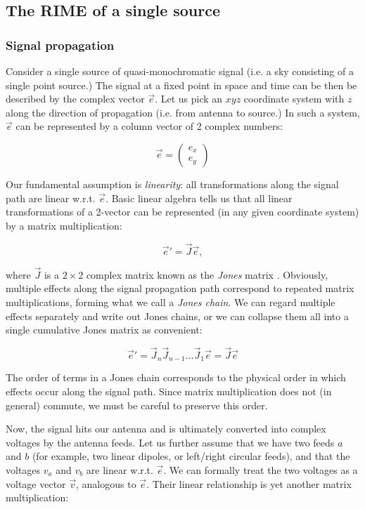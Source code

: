\documentclass[]{aa}
\begin{document}
\subsection{The RIME of a single source}

\subsubsection{Signal propagation}

Consider a single source of quasi-monochromatic signal (i.e. a sky consisting of a single point source.) The signal at a fixed point in space and time can be then be described by the complex vector $\vec e$. Let us pick an $xyz$ coordinate system with $z$ along the direction of propagation (i.e. from antenna to source.) In such a system, $\vec e$ can be represented by a column vector of 2 complex numbers:

\[
\vec e = \left( \begin{array}{c}e_x\\e_y\end{array} \right) 
\]

Our fundamental assumption is {\em linearity}: all transformations along the signal path are linear w.r.t. $\vec e$. Basic linear algebra tells us that all linear transformations of a 2-vector can be represented (in any given coordinate system) by a matrix multiplication:

\begin{equation}
\vec e' = \vec J \vec e,
\end{equation}

where $\vec J$ is a $2\times2$ complex matrix known as the {\em Jones} matrix \citep{jones}. Obviously, multiple effects along the signal propagation path correspond to repeated matrix multiplications, forming what we call a {\em Jones chain}. We can regard multiple effects separately and write out Jones chains, or we can collapse them all into a single cumulative Jones matrix as convenient:

\begin{equation}\label{eq:jones-chain}
\vec e' = \vec J_n \vec J_{n-1} ... \vec J_1 \vec e = \vec J \vec e
\end{equation}

The order of terms in a Jones chain corresponds to the physical order in which effects occur along the signal path. Since matrix multiplication does not (in general) commute, we must be careful to preserve this order. 

Now, the signal hits our antenna and is ultimately converted into complex voltages by the antenna feeds. Let us further assume that we have two feeds $a$ and $b$ (for example, two linear dipoles, or left/right circular feeds), and that the voltages $v_a$ and $v_b$ are linear w.r.t. $\vec e$. We can formally treat the two voltages as a voltage vector $\vec v$, analogous to $\vec e$. Their linear relationship is yet another matrix multiplication:
\end{document}

